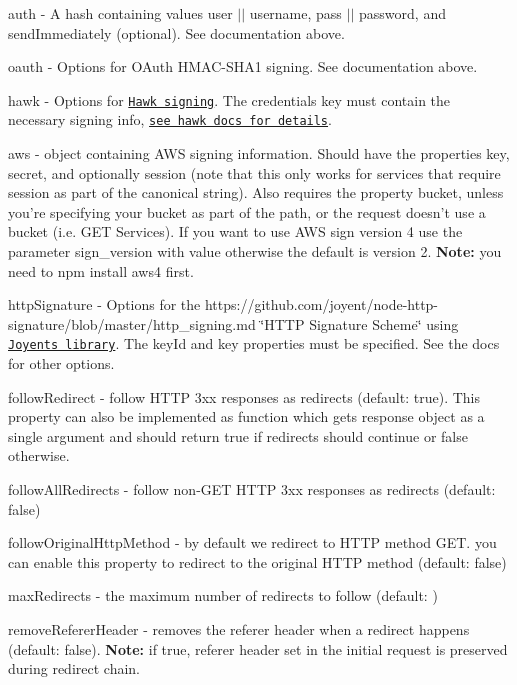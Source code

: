 \begin{DoxyItemize}
\item {\ttfamily auth} -\/ A hash containing values {\ttfamily user} $\vert$$\vert$ {\ttfamily username}, {\ttfamily pass} $\vert$$\vert$ {\ttfamily password}, and {\ttfamily send\+Immediately} (optional). See documentation above.
\item {\ttfamily oauth} -\/ Options for O\+Auth H\+M\+A\+C-\/\+S\+H\+A1 signing. See documentation above.
\item {\ttfamily hawk} -\/ Options for \href{https://github.com/hueniverse/hawk}{\tt Hawk signing}. The {\ttfamily credentials} key must contain the necessary signing info, \href{https://github.com/hueniverse/hawk#usage-example}{\tt see hawk docs for details}.
\item {\ttfamily aws} -\/ {\ttfamily object} containing A\+WS signing information. Should have the properties {\ttfamily key}, {\ttfamily secret}, and optionally {\ttfamily session} (note that this only works for services that require session as part of the canonical string). Also requires the property {\ttfamily bucket}, unless you’re specifying your {\ttfamily bucket} as part of the path, or the request doesn’t use a bucket (i.\+e. G\+ET Services). If you want to use A\+WS sign version 4 use the parameter {\ttfamily sign\+\_\+version} with value {} otherwise the default is version 2. {\bfseries Note\+:} you need to {\ttfamily npm install aws4} first.
\item {\ttfamily http\+Signature} -\/ Options for the https\+://github.com/joyent/node-\/http-\/signature/blob/master/http\+\_\+signing.\+md \char`\"{}\+H\+T\+T\+P Signature Scheme\char`\"{} using \href{https://github.com/joyent/node-http-signature}{\tt Joyent\textquotesingle{}s library}. The {\ttfamily key\+Id} and {\ttfamily key} properties must be specified. See the docs for other options. 


\item {\ttfamily follow\+Redirect} -\/ follow H\+T\+TP 3xx responses as redirects (default\+: {\ttfamily true}). This property can also be implemented as function which gets {\ttfamily response} object as a single argument and should return {\ttfamily true} if redirects should continue or {\ttfamily false} otherwise.
\item {\ttfamily follow\+All\+Redirects} -\/ follow non-\/\+G\+ET H\+T\+TP 3xx responses as redirects (default\+: {\ttfamily false})
\item {\ttfamily follow\+Original\+Http\+Method} -\/ by default we redirect to H\+T\+TP method G\+ET. you can enable this property to redirect to the original H\+T\+TP method (default\+: {\ttfamily false})
\item {\ttfamily max\+Redirects} -\/ the maximum number of redirects to follow (default\+: {})
\item {\ttfamily remove\+Referer\+Header} -\/ removes the referer header when a redirect happens (default\+: {\ttfamily false}). {\bfseries Note\+:} if true, referer header set in the initial request is preserved during redirect chain. 



\end{DoxyItemize}

